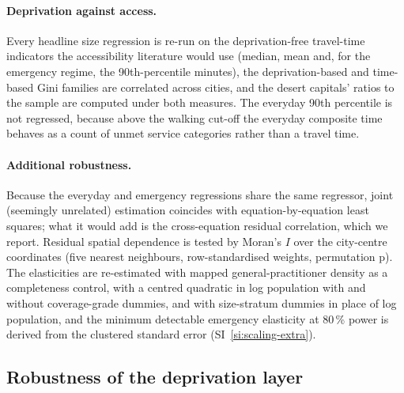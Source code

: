 \documentclass[11pt]{article}
\begin{document}
\paragraph{Deprivation against access.} Every headline size regression is
re-run on the deprivation-free travel-time indicators the accessibility
literature would use (median, mean and, for the emergency regime, the
90th-percentile minutes), the deprivation-based and time-based Gini
families are correlated across cities, and the desert capitals' ratios to
the sample are computed under both measures. The everyday 90th percentile
is not regressed, because above the walking cut-off the everyday composite
time behaves as a count of unmet service categories rather than a travel
time.

\paragraph{Additional robustness.} Because the everyday and emergency
regressions share the same regressor, joint (seemingly unrelated)
estimation coincides with equation-by-equation least squares; what it
would add is the cross-equation residual correlation, which we report.
Residual spatial dependence is tested by Moran's $I$ over the city-centre
coordinates (five nearest neighbours, row-standardised weights,
permutation p). The elasticities are re-estimated with mapped
general-practitioner density as a completeness control, with a centred
quadratic in log population with and without coverage-grade dummies, and
with size-stratum dummies in place of log population, and the minimum
detectable emergency elasticity at 80\,\% power is derived from the
clustered standard error (SI~\ref{si:scaling-extra}).

\subsection{Robustness of the deprivation layer}\label{sec:m-robustness}
\end{document}
